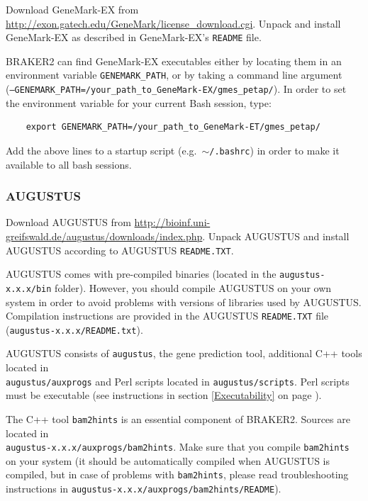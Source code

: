 \documentclass[a4paper,10pt]{report}
\begin{document}
Download GeneMark-EX from \url{http://exon.gatech.edu/GeneMark/license_download.cgi}.
 Unpack and install GeneMark-EX as described in GeneMark-EX's \texttt{README} file.

BRAKER2 can find GeneMark-EX executables either by locating them in an environment variable \texttt{GENEMARK\_PATH}, or by taking a command line argument\\ (\texttt{--GENEMARK\_PATH=/your\_path\_to\_GeneMark-EX/gmes\_petap/}). In order to set the environment variable for your current Bash session, type: 

    \begin{verbatim}
    export GENEMARK_PATH=/your_path_to_GeneMark-ET/gmes_petap/
\end{verbatim}

Add the above lines to a startup script (e.g.~\texttt{$\sim$/.bashrc}) in order to make it available to all bash sessions.

\subsubsection{AUGUSTUS}

Download AUGUSTUS from \url{http://bioinf.uni-greifswald.de/augustus/downloads/index.php}.
 Unpack AUGUSTUS and install AUGUSTUS  according to AUGUSTUS \texttt{README.TXT}. 
 
 AUGUSTUS comes with pre-compiled binaries (located in the 
   \texttt{augustus-x.x.x/bin} folder). However, you should compile AUGUSTUS on your own system in order to avoid problems with versions of libraries used by AUGUSTUS. Compilation instructions are provided in the AUGUSTUS \texttt{README.TXT} file
   (\texttt{augustus-x.x.x/README.txt}).

AUGUSTUS consists of \texttt{augustus}, the gene prediction tool, additional C++ tools located in\\ \texttt{augustus/auxprogs} and Perl scripts located in \texttt{augustus/scripts}. Perl scripts must be executable (see instructions in section \ref{Executability} on page \pageref{Executability}). 
   
   The C++ tool \texttt{bam2hints} is an essential component of BRAKER2. Sources are located in \\\texttt{augustus-x.x.x/auxprogs/bam2hints}. Make sure that you compile \texttt{bam2hints} on your system (it should be automatically compiled when AUGUSTUS is compiled, but in case of problems with \texttt{bam2hints}, please read troubleshooting instructions in 
   \texttt{augustus-x.x.x/auxprogs/bam2hints/README}).
   
\end{document}
